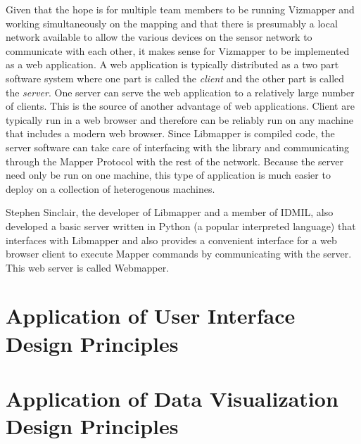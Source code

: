 Given that the hope is for multiple team members to be running Vizmapper and working simultaneously on the mapping and that there is presumably a local network available to allow the various devices on the sensor network to communicate with each other, it makes sense for Vizmapper to be implemented as a web application. A web application is typically distributed as a two part software system where one part is called the \emph{client} and the other part is called the \emph{server}. One server can serve the web application to a relatively large number of clients. This is the source of another advantage of web applications. Client are typically run in a web browser and therefore can be reliably run on any machine that includes a modern web browser. Since Libmapper is compiled code, the server software can take care of interfacing with the library and communicating through the Mapper Protocol with the rest of the network. Because the server need only be run on one machine, this type of application is much easier to deploy on a collection of heterogenous machines.

Stephen Sinclair, the developer of Libmapper and a member of IDMIL, also developed a basic server written in Python (a popular interpreted language) that interfaces with Libmapper and also provides a convenient interface for a web browser client to execute Mapper commands by communicating with the server. This web server is called Webmapper.

\section{Application of User Interface Design Principles}

\section{Application of Data Visualization Design Principles}
